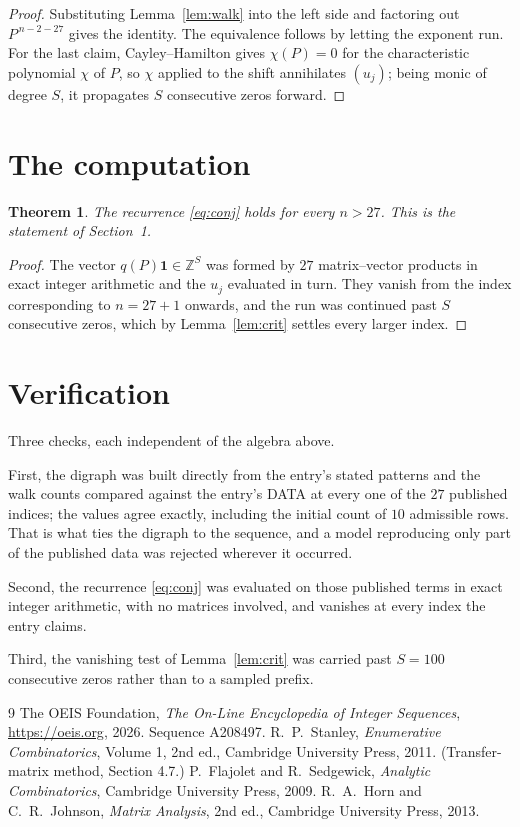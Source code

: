 \documentclass[11pt,a4paper]{article}
\theoremstyle{plain}
\newtheorem{theorem}{Theorem}
\theoremstyle{definition}
\begin{document}
\begin{proof}
Substituting Lemma~\ref{lem:walk} into the left side and factoring out
$P^{\,n-2-27}$ gives the identity. The equivalence follows by letting the exponent
run. For the last claim, Cayley--Hamilton gives $\chi(P)=0$ for the characteristic
polynomial $\chi$ of $P$, so $\chi$ applied to the shift annihilates $(u_j)$; being monic of
degree $S$, it propagates $S$ consecutive zeros forward.
\end{proof}

\section{The computation}

\begin{theorem}
The recurrence \eqref{eq:conj} holds for every $n>27$. This is the statement of
Section~1.
\end{theorem}

\begin{proof}
The vector $q(P)\mathbf{1}\in\mathbb{Z}^{S}$ was formed by $27$ matrix--vector
products in exact integer arithmetic and the $u_j$ evaluated in turn. They vanish from the
index corresponding to $n=27+1$ onwards, and the run was continued past $S$ consecutive
zeros, which by Lemma~\ref{lem:crit} settles every larger index.
\end{proof}

\section{Verification}

Three checks, each independent of the algebra above.

First, the digraph was built directly from the entry's stated patterns and the walk counts
compared against the entry's DATA at every one of the $27$ published indices; the
values agree exactly, including the initial count of $10$ admissible rows. That is
what ties the digraph to the sequence, and a model reproducing only part of the published
data was rejected wherever it occurred.

Second, the recurrence \eqref{eq:conj} was evaluated on those published terms in exact
integer arithmetic, with no matrices involved, and vanishes at every index the entry claims.

Third, the vanishing test of Lemma~\ref{lem:crit} was carried past $S=100$ consecutive
zeros rather than to a sampled prefix.

\begin{thebibliography}{9}
 The OEIS Foundation, \emph{The On-Line Encyclopedia of Integer
Sequences}, \url{https://oeis.org}, 2026. Sequence A208497.
 R.~P.~Stanley, \emph{Enumerative Combinatorics}, Volume 1, 2nd ed.,
Cambridge University Press, 2011. (Transfer-matrix method, Section 4.7.)
 P.~Flajolet and R.~Sedgewick, \emph{Analytic Combinatorics}, Cambridge
University Press, 2009.
 R.~A.~Horn and C.~R.~Johnson, \emph{Matrix Analysis}, 2nd ed., Cambridge
University Press, 2013.
\end{thebibliography}
\end{document}
